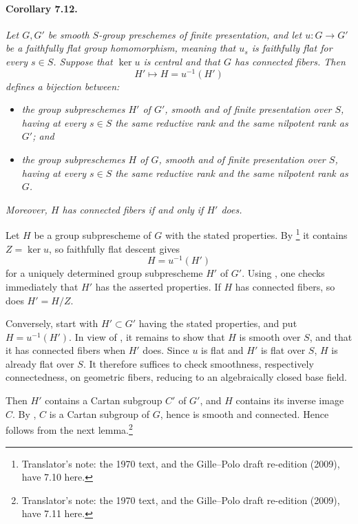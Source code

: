 \paragraph{\textbf{Corollary 7.12.}}
\emph{Let \(G,G'\) be smooth \(S\)-group preschemes of finite
presentation, and let \(u:G\to G'\) be a faithfully flat group
homomorphism, meaning that \(u_s\) is faithfully flat for every
\(s\in S\). Suppose that \(\ker u\) is central and that \(G\) has
connected fibers. Then}
\[
  H'\longmapsto H=u^{-1}(H')
\]
\emph{defines a bijection between:}

\begin{itemize}
\item \emph{the group subpreschemes \(H'\) of \(G'\), smooth and of
finite presentation over \(S\), having at every \(s\in S\) the same
reductive rank and the same nilpotent rank as \(G'\); and}
\item \emph{the group subpreschemes \(H\) of \(G\), smooth and of
finite presentation over \(S\), having at every \(s\in S\) the same
reductive rank and the same nilpotent rank as \(G\).}
\end{itemize}

\emph{Moreover, \(H\) has connected fibers if and only if \(H'\)
does.}

Let \(H\) be a group subprescheme of \(G\) with the stated
properties. By \footnote{Translator's note: the 1970
text, and the Gille--Polo draft re-edition (2009), have 7.10 here.} it contains \(Z=\ker u\), so faithfully flat
descent gives
\[
  H=u^{-1}(H')
\]
for a uniquely determined group subprescheme \(H'\) of \(G'\).
Using , one checks immediately that \(H'\) has the asserted
properties. If \(H\) has connected fibers, so does \(H'=H/Z\).

Conversely, start with \(H'\subset G'\) having the stated
properties, and put \(H=u^{-1}(H')\). In view of , it remains
to show that \(H\) is smooth over \(S\), and that it has connected
fibers when \(H'\) does. Since \(u\) is flat and \(H'\) is flat over
\(S\), \(H\) is already flat over \(S\). It therefore suffices to
check smoothness, respectively connectedness, on geometric fibers,
reducing to an algebraically closed base field.

Then \(H'\) contains a Cartan subgroup \(C'\) of \(G'\), and \(H\)
contains its inverse image \(C\). By , \(C\) is a Cartan
subgroup of \(G\), hence is smooth and connected. Hence
 follows from the next lemma.\footnote{Translator's
note: the 1970 text, and the Gille--Polo draft re-edition (2009), have 7.11
here.}

